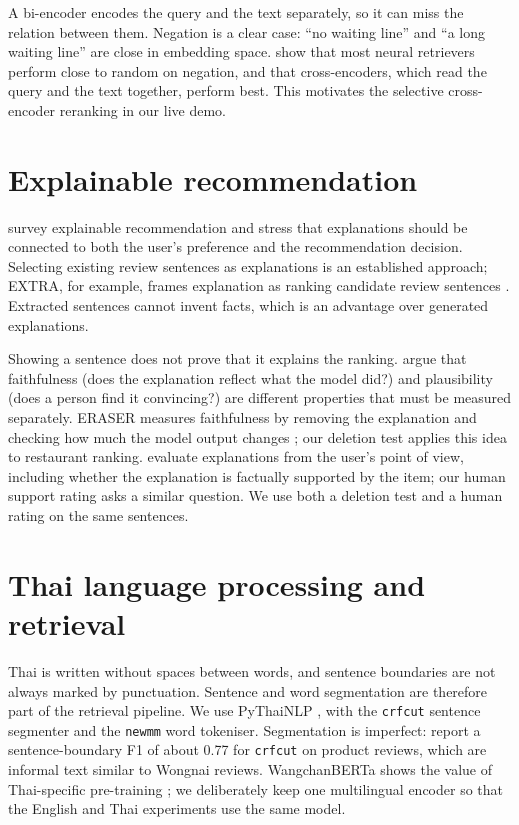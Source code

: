A bi-encoder encodes the query and the text separately, so it can miss the relation between
them. Negation is a clear case: ``no waiting line'' and ``a long waiting line'' are close in
embedding space. \citet{weller2024nevir} show that most neural retrievers perform close to
random on negation, and that cross-encoders, which read the query and the text together, perform
best. This motivates the selective cross-encoder reranking in our live demo.

\section{Explainable recommendation}
\citet{zhang2020explainable} survey explainable recommendation and stress that explanations
should be connected to both the user's preference and the recommendation decision. Selecting
existing review sentences as explanations is an established approach; EXTRA, for example,
frames explanation as ranking candidate review sentences \citep{li2021extra}. Extracted
sentences cannot invent facts, which is an advantage over generated explanations.

Showing a sentence does not prove that it explains the ranking. \citet{jacovi2020faithfulness}
argue that faithfulness (does the explanation reflect what the model did?) and plausibility
(does a person find it convincing?) are different properties that must be measured separately.
ERASER measures faithfulness by removing the explanation and checking how much the model output
changes \citep{deyoung2020eraser}; our deletion test applies this idea to restaurant ranking.
\citet{zhang2025enhancing} evaluate explanations from the user's point of view, including whether
the explanation is factually supported by the item; our human support rating asks a similar
question. We use both a deletion test and a human rating on the same sentences.

\section{Thai language processing and retrieval}
Thai is written without spaces between words, and sentence boundaries are not always marked by
punctuation. Sentence and word segmentation are therefore part of the retrieval pipeline. We use
PyThaiNLP \citep{phatthiyaphaibun2023pythainlp}, with the \texttt{crfcut} sentence segmenter
and the \texttt{newmm} word tokeniser. Segmentation is imperfect: \citet{lowphansirikul2020scb}
report a sentence-boundary F1 of about 0.77 for \texttt{crfcut} on product reviews, which are
informal text similar to Wongnai reviews. WangchanBERTa shows the value of
Thai-specific pre-training \citep{lowphansirikul2021wangchanberta}; we deliberately keep one
multilingual encoder so that the English and Thai experiments use the same model.

